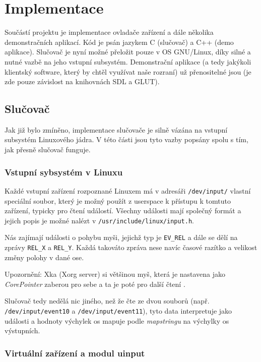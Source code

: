 
\section{Implementace}

Součástí projektu je implementace ovladače zařízení a dále několika
demonstračních aplikací. Kód je psán jazykem C (slučovač) a C++ (demo aplikace).
Slučovač je nyní možné přeložit pouze v OS GNU/Linux,
díky silné a nutné vazbě na jeho vstupní subsystém. Demonstrační aplikace
(a tedy jakýkoli klientský software, který by chtěl využívat naše rozraní)
už přenositelné jsou (je zde pouze závislost na knihovnách SDL a GLUT).

\subsection{Slučovač}\label{merging_implem}

Jak již bylo zmíněno, implementace slučovače je silně vázána na vstupní
subsystém Linuxového jádra. V této části jsou tyto vazby popsány spolu
s tím, jak přesně slučovač funguje.

\subsubsection*{Vstupní sybsystém v Linuxu}
Každé vstupní zařízení rozpoznané Linuxem má v adresáři {\tt /dev/input/}
vlastní speciální soubor, který je možný použít z userspace k přístupu
k tomtuto zařízení, typicky pro čtení událostí.
Všechny události mají společný formát a jejich popis je možné nalézt
v {\tt /usr/include/linux/input.h}.

Nás zajímají události o pohybu myši, jejichž typ je {\tt EV\_REL}
a dále se dělí na zprávy {\tt REL\_X} a {\tt REL\_Y}.
Každá takováto zpráva nese navíc časové razítko a velikost změny
polohy v dané ose.

Upozornění: Xka (Xorg server) si většinou myš, která je nastavena
jako {\it CorePointer} zaberou pro sebe a ta je poté pro další čtení
.

Slučovač tedy nedělá nic jiného, než že čte ze dvou souborů (např.
{\tt /dev/input/event10} a {\tt /dev/input/event11}), tyto data
interpretuje jako události a hodnoty výchylek os mapuje podle {\it mapstringu}
na výchylky os výstupních.

\subsubsection*{Virtuální zařízení a modul uinput}

